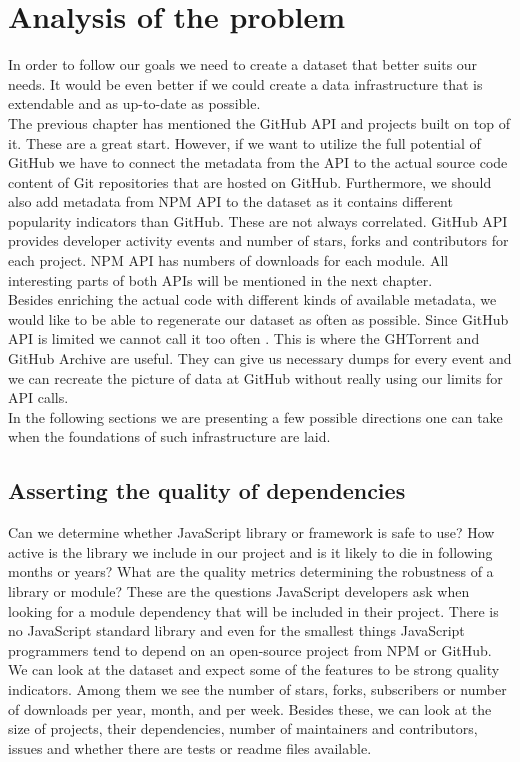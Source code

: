 \documentclass[thesis=M,english]{FITthesis}[2012/10/20]
\begin{document}
\chapter{Analysis of the problem}

In order to follow our goals we need to create a dataset that better suits our needs. It would be even better if we could create a data infrastructure that is extendable and as up-to-date as possible. \\

The previous chapter has mentioned the GitHub API and projects built on top of it. These are a great start. However, if we want to utilize the full potential of GitHub we have to connect the metadata from the API to the actual source code content of Git repositories that are hosted on GitHub. Furthermore, we should also add metadata from NPM API to the dataset as it contains different popularity indicators than GitHub. These are not always correlated. GitHub API provides developer activity events and number of stars, forks and contributors for each project. NPM API has numbers of downloads for each module. All interesting parts of both APIs will be mentioned in the next chapter. \\

Besides enriching the actual code with different kinds of available metadata, we would like to be able to regenerate our dataset as often as possible. Since GitHub API is limited we cannot call it too often \cite{gh_limits}. This is where the GHTorrent and GitHub Archive are useful. They can give us necessary dumps for every event and we can recreate the picture of data at GitHub without really using our limits for API calls. \\

In the following sections we are presenting a few possible directions one can take when the foundations of such infrastructure are laid. \\

\section{Asserting the quality of dependencies}

Can we determine whether JavaScript library or framework is safe to use? How active is the library we include in our project and is it likely to die in following months or years? What are the quality metrics determining the robustness of a library or module? These are the questions JavaScript developers ask when looking for a module dependency that will be included in their project. There is no JavaScript standard library and even for the smallest things JavaScript programmers tend to depend on an open-source project from NPM or GitHub. We can look at the dataset and expect some of the features to be strong quality indicators. Among them we see the number of stars, forks, subscribers or number of downloads per year, month, and per week. Besides these, we can look at the size of projects, their dependencies, number of maintainers and contributors, issues and whether there are tests or readme files available. \\
\end{document}
